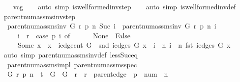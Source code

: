 \begin{isabellebody}
%
\isadelimproof
\ \ %
\endisadelimproof
%
\isatagproof
{}\isamarkupfalse%
\ vcg\isanewline
\ \ \isamarkupfalse%
\ {\isacharparenleft}auto\ simp{\isacharcolon}\ is{\isacharunderscore}wellformed{\isacharunderscore}inv{\isacharunderscore}step{\isacharparenright}\isanewline
\ \ \isamarkupfalse%
\ {\isacharparenleft}auto\ simp{\isacharcolon}\ is{\isacharunderscore}wellformed{\isacharunderscore}inv{\isacharunderscore}def{\isacharparenright}\isanewline
\ \ \isamarkupfalse%
%
\endisatagproof
{\isafoldproof}%
%
\isadelimproof
\isanewline
%
\endisadelimproof
\isanewline
{}\isamarkupfalse%
\ parent{\isacharunderscore}num{\isacharunderscore}assms{\isacharunderscore}inv{\isacharunderscore}step{\isacharcolon}\isanewline
\ \ {\isachardoublequoteopen}parent{\isacharunderscore}num{\isacharunderscore}assms{\isacharunderscore}inv\ G\ r\ p\ n\ {\isacharparenleft}Suc\ i{\isacharparenright}\ {\isasymlongleftrightarrow}\ parent{\isacharunderscore}num{\isacharunderscore}assms{\isacharunderscore}inv\ G\ r\ p\ n\ i\isanewline
\ \ \ \ {\isasymand}\ {\isacharparenleft}i\ {\isasymnoteq}\ r\ {\isasymlongrightarrow}\ {\isacharparenleft}case\ p\ i\ of\isanewline
\ \ \ \ \ \ None\ {\isasymRightarrow}\ False\isanewline
\ \ \ \ {\isacharbar}\ Some\ x\ {\isasymRightarrow}\ x\ {\isacharless}\ iedge{\isacharunderscore}cnt\ G\ {\isasymand}\ snd\ {\isacharparenleft}iedges\ G\ x{\isacharparenright}\ {\isacharequal}\ i\ {\isasymand}\ n\ i\ {\isacharequal}\ n\ {\isacharparenleft}fst\ {\isacharparenleft}iedges\ G\ x{\isacharparenright}{\isacharparenright}\ {\isacharplus}\ {}{\isacharparenright}{\isacharparenright}{\isachardoublequoteclose}\isanewline
%
\isadelimproof
\ \ %
\endisadelimproof
%
\isatagproof
{}\isamarkupfalse%
\ {\isacharparenleft}auto\ simp{\isacharcolon}\ parent{\isacharunderscore}num{\isacharunderscore}assms{\isacharunderscore}inv{\isacharunderscore}def\ less{\isacharunderscore}Suc{\isacharunderscore}eq{\isacharparenright}%
\endisatagproof
{\isafoldproof}%
%
\isadelimproof
\isanewline
%
\endisadelimproof
\isanewline
{}\isamarkupfalse%
\ {\isacharparenleft}\ parent{\isacharunderscore}num{\isacharunderscore}assms{\isacharunderscore}impl{\isacharparenright}\ parent{\isacharunderscore}num{\isacharunderscore}assms{\isacharunderscore}spec{\isacharcolon}\isanewline
\ \ {\isachardoublequoteopen}{\isasymforall}G\ r\ p\ n{\isachardot}\ {\isasymGamma}\ {\isasymturnstile}\isactrlsub t\ {\isasymlbrace}\ {\isasymacute}G\ {\isacharequal}\ G\ {\isasymand}\ {\isasymacute}r\ {\isacharequal}\ r\ {\isasymand}\ {\isasymacute}parent{\isacharunderscore}edge\ {\isacharequal}\ p\ {\isasymand}\ {\isasymacute}num\ {\isacharequal}\ n{\isasymrbrace}\isanewline

\end{isabellebody}
